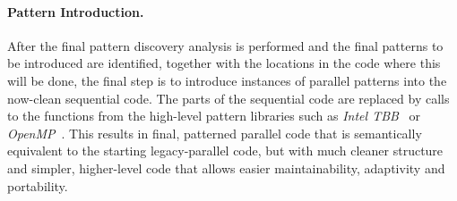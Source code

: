   


\paragraph{Pattern Introduction.}
After the final pattern discovery analysis is performed and the final patterns to be introduced are identified, together with the locations in the code where this will be done, the final step is to introduce instances of parallel patterns into the now-clean sequential code.
The parts of the sequential code are replaced by calls to the functions from the high-level pattern libraries such as \emph{Intel TBB}~\cite{DBLP:reference/parallel/X11pz} or \emph{OpenMP}~\cite{10.1109/99.660313}.
This results in final, patterned parallel code that is semantically equivalent to the starting legacy-parallel code, but with much cleaner structure and simpler, higher-level code that allows easier maintainability, adaptivity and portability.


